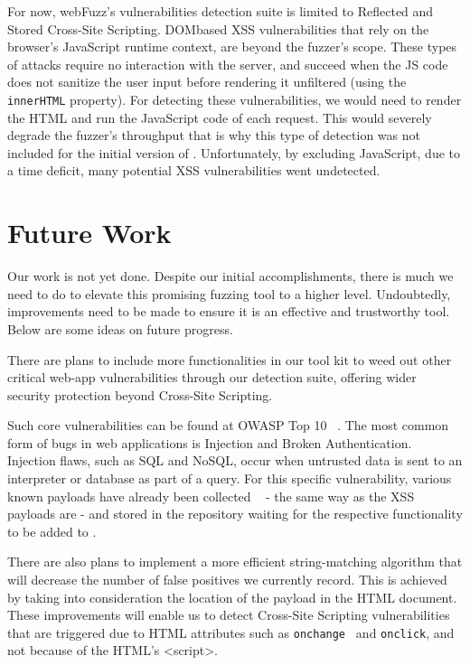 For now, webFuzz's vulnerabilities detection suite is limited to Reflected and Stored Cross-Site Scripting. DOMbased XSS vulnerabilities that rely on the browser's JavaScript runtime context, are beyond the fuzzer's scope. These types of attacks require no interaction with
the server, and succeed when the JS code does not sanitize the user input before rendering it unfiltered (\eg using the {\tt innerHTML} property). For detecting these vulnerabilities, we would need to render the HTML and run the JavaScript code of each request. This would severely degrade the fuzzer's throughput that is why this type of detection was not included for the initial version of \pname{}.  Unfortunately, by excluding JavaScript, due to a time deficit, many potential XSS vulnerabilities went undetected.

\section{Future Work}
Our work is not yet done. Despite our initial accomplishments, there is much we need to do to elevate this promising fuzzing tool to a higher level. Undoubtedly, improvements need to be made to ensure it is an effective and trustworthy tool. Below are some ideas on future progress.

There are plans to include more functionalities in our tool kit to weed out other critical web-app vulnerabilities through our detection suite, offering wider security protection beyond Cross-Site Scripting.

Such core vulnerabilities can be found at OWASP Top 10 ~\cite{owasp2017}. The most common form of bugs in web applications is Injection and Broken Authentication. Injection flaws, such as SQL and NoSQL, occur when untrusted data is sent to an interpreter or database as part of a query. For this specific vulnerability, various known payloads have already been collected ~\cite{seclist} - the same way as the XSS payloads are - and stored in the repository waiting for the respective functionality to be added to \pname{}.

There are also plans to implement a more efficient string-matching algorithm that will decrease the number of false positives we currently record. This is achieved by taking into consideration the location of the payload in the HTML document. These improvements will enable us to detect Cross-Site Scripting vulnerabilities that are triggered due to HTML attributes such as {\tt onchange } and {\tt onclick}, and not because of the HTML's <script>.

